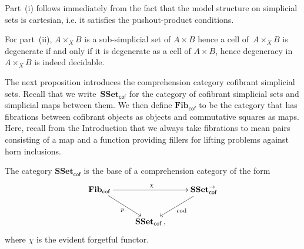\documentclass[reqno,10pt,a4paper,oneside,draft]{amsart}
\makeatletter
\renewenvironment{proof}[1][\proofname] {\par\pushQED{\qed}\normalfont\topsep6\p@\@plus6\p@\relax\trivlist\item[\hskip\labelsep\bf#1\@addpunct{.}]\ignorespaces}{\popQED\endtrivlist\@endpefalse}
\numberwithin{equation}{section}
\theoremstyle{mythm}
\theoremstyle{mydef}
\theoremstyle{myrmk}
\newcommand{\co}{\colon}
\newcommand{\SSet}{\mathbf{SSet}}
\makeatother
\begin{document}
\begin{proof} Part~(i) follows immediately from the fact that the model structure on simplicial sets is cartesian, i.e. it satisfies the pushout-product conditions.


For part~(ii), $A \times_X B$ is a sub-simplicial set of $A \times B$ hence a cell of~$A \times_X B$ is degenerate if and only if it is degenerate as a cell of $A \times B$, hence degeneracy
in~$A \times_X B$ is indeed decidable. 
\end{proof}


The next proposition introduces the  comprehension category  cofibrant simplicial sets.
Recall that we write~$\SSet_{\mathsf{cof}}$ for the category of 
cofibrant simplicial sets and simplicial maps between them. We then define $\mathbf{Fib}_{ \mathsf{cof}}$ to be the category that 
has fibrations between cofibrant objects as objects and commutative squares as maps. Here,
recall from the Introduction that we always take fibrations to mean pairs consisting of a map
and a function providing fillers for lifting problems against horn inclusions. 


\begin{proposition} \label{thm:compcat}
The category $\SSet_{\mathsf{cof}}$ is the base of a comprehension category
of the form
\begin{equation*}
\begin{gathered}
\xymatrix{
\mathbf{Fib}_{ \mathsf{cof}} \ar[dr]_{p} \ar[rr]^{\chi} & & \SSet^{\to}_{\mathsf{cof}} \ar[dl]^{\mathrm{cod}} \\ 
 & \SSet_{\mathsf{cof}} \, , &  }
 \end{gathered}
 \end{equation*}
 where $\chi$ is the evident forgetful functor.
\end{proposition} 
\end{document}
